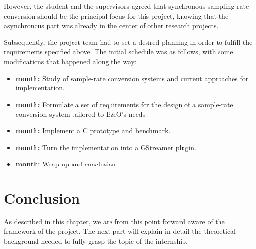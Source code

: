 However, the student and the supervisors agreed that synchronous sampling rate conversion should be the principal focus for this project, knowing that the asynchronous part was already in the center of other research projects.

Subsequently, the project team had to set a desired planning in order to fulfill the requirements specified above. The initial schedule was as follows, with some modifications that happened along the way: 

\begin{itemize}
	\item {} \textbf{month:} Study of sample-rate conversion systems and current approaches for implementation.
	\item {} \textbf{month:} Formulate a set of requirements for the design of a sample-rate conversion system tailored to  B\&O's needs.
	\item {} \textbf{month:} Implement a C prototype and benchmark.
	\item {} \textbf{month:} Turn the implementation into a GStreamer plugin.
	\item {} \textbf{month:} Wrap-up and conclusion. 
\end{itemize}



\section*{Conclusion}

As described in this chapter, we are from this point forward aware of the framework of the project. The next part will explain in detail the theoretical background needed to fully grasp the topic of the internship. 
